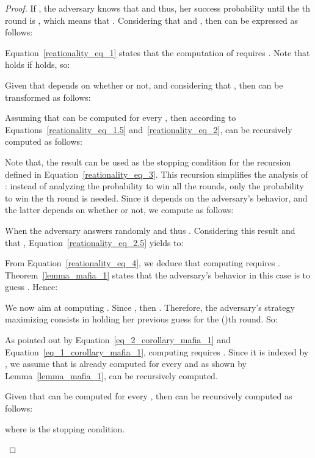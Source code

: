 \documentclass{llncs}
\begin{document}
\begin{proof}

If , the adversary knows that  and thus, her success probability until the th round 
is , which means that . Considering 
that  and , then  can be expressed as 
follows:


\noindent Equation~\ref{reationality_eq_1} states that the computation of 
 requires . Note that  
holds if  holds, so:


\noindent Given that  depends on whether  
or not, and considering that , then  can be transformed as follows:


\noindent Assuming that  can be 
computed for every , then according to Equations~\ref{reationality_eq_1.5} 
and~\ref{reationality_eq_2},  can be 
recursively computed as follows:



\noindent Note that, the result  can be used as the stopping condition for the recursion defined in 
Equation~\ref{reationality_eq_3}. This recursion simplifies the analysis of 
: instead of analyzing the probability to win all the  rounds, 
only the probability to win the th round is needed. Since it depends on the 
adversary's behavior, and the latter depends on whether  or 
not, we compute   as follows:


\noindent When  the adversary answers randomly and thus 
. 
Considering this result and that  ,  Equation~\ref{reationality_eq_2.5} yields 
to:




\noindent From Equation~\ref{reationality_eq_4}, we deduce that computing 
 requires . Theorem~\ref{lemma_mafia_1} states that the adversary's behavior 
in this case is to guess . Hence:


\noindent We now aim at computing . Since , then  . Therefore, the 
adversary's strategy  maximizing  consists in holding her previous guess for the 
()th round. So:


\noindent As pointed out by Equation~\ref{eq_2_corollary_mafia_1} and 
Equation~\ref{eq_1_corollary_mafia_1}, computing  requires . Since it is indexed by , we assume that 
 is already computed for every  and as shown by 
Lemma~\ref{lemma_mafia_1},  can be recursively computed.

\begin{lemma}\label{lemma_mafia_1}
Given that  can be computed for every , then  can be recursively 
computed as follows:


where  is the 
stopping condition.
\end{lemma}


\end{proof}
\end{document}
